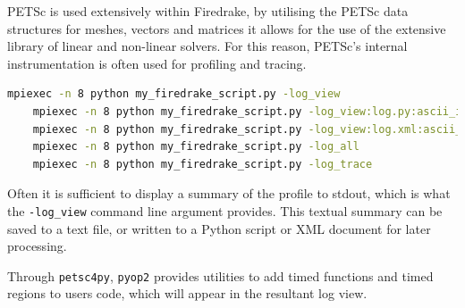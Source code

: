 \documentclass[a4paper,11pt]{article}
\begin{document}
PETSc is used extensively within Firedrake, by utilising the PETSc data structures for meshes, vectors and matrices it allows for the use of the extensive library of linear and non-linear solvers.
For this reason, PETSc's internal instrumentation is often used for profiling and tracing.
\begin{lstlisting}[language=bash]
	mpiexec -n 8 python my_firedrake_script.py -log_view
	mpiexec -n 8 python my_firedrake_script.py -log_view:log.py:ascii_info_detail
	mpiexec -n 8 python my_firedrake_script.py -log_view:log.xml:ascii_xml
	mpiexec -n 8 python my_firedrake_script.py -log_all
	mpiexec -n 8 python my_firedrake_script.py -log_trace
\end{lstlisting}
Often it is sufficient to display a summary of the profile to stdout, which is what the \verb`-log_view` command line argument provides.
This textual summary can be saved to a text file, or written to a Python script or XML document for later processing.

Through \verb`petsc4py`, \verb`pyop2` provides utilities to add timed functions and timed regions to users code, which will appear in the resultant log view.
\end{document}
